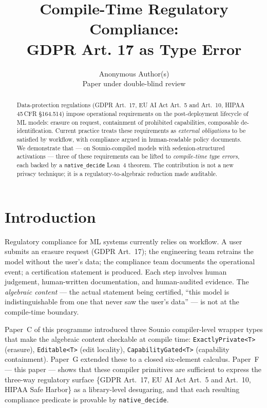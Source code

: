 \documentclass{article}
\title{Compile-Time Regulatory Compliance:\\
       GDPR Art. 17 as Type Error}
\author{Anonymous Author(s)\\ Paper under double-blind review}
\begin{document}
\maketitle

\begin{abstract}
Data-protection regulations (GDPR Art.~17, EU AI Act Art.~5 and Art.~10,
HIPAA 45\,CFR §164.514) impose operational requirements on the
post-deployment lifecycle of ML models: erasure on request, containment
of prohibited capabilities, composable de-identification.  Current
practice treats these requirements as \emph{external obligations} to be
satisfied by workflow, with compliance argued in human-readable policy
documents.  We demonstrate that --- on Sounio-compiled models with
sedenion-structured activations --- three of these requirements can
be lifted to \emph{compile-time type errors}, each backed by a
\texttt{native\_decide} Lean~4 theorem.  The contribution is not a
new privacy technique; it is a regulatory-to-algebraic reduction
made auditable.
\end{abstract}

\section{Introduction}

Regulatory compliance for ML systems currently relies on workflow.  A
user submits an erasure request (GDPR Art.~17); the engineering team
retrains the model without the user's data; the compliance team
documents the operational event; a certification statement is produced.
Each step involves human judgement, human-written documentation, and
human-audited evidence.  The \emph{algebraic content} --- the actual
statement being certified, ``this model is indistinguishable from one
that never saw the user's data'' --- is not at the compile-time
boundary.

Paper~C of this programme introduced three Sounio compiler-level
wrapper types that make the algebraic content checkable at compile
time:
\texttt{ExactlyPrivate<T>} (erasure),
\texttt{Editable<T>} (edit locality),
\texttt{CapabilityGated<T>} (capability containment).
Paper~G extended these to a closed six-element calculus.
Paper~F --- this paper --- shows that these compiler primitives are
sufficient to express the three-way regulatory surface
\{GDPR Art.~17, EU AI Act Art.~5 and Art.~10, HIPAA Safe Harbor\} as
a library-level desugaring, and that each resulting compliance predicate
is provable by \texttt{native\_decide}.
\end{document}
